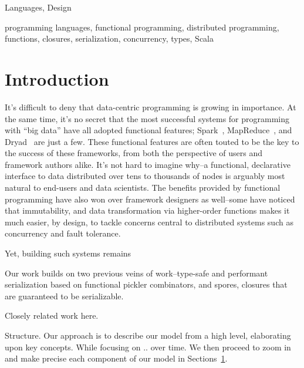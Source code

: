\documentclass[preprint]{sigplanconf}
\theoremstyle{definition}
\theoremstyle{definition}
\begin{document}
\terms
Languages, Design

\keywords
programming languages, functional programming, distributed programming,
functions, closures, serialization, concurrency, types, Scala

\section{Introduction}

It's difficult to deny that data-centric programming is growing in importance.
At the same time, it's no secret that the most successful systems for
programming with ``big data'' have all adopted functional features;
Spark~\cite{Spark}, MapReduce~\cite{MapReduce}, and Dryad~\cite{Dryad} are
just a few. These functional features are often touted to be the key to the
success of these frameworks, from both the perspective of users and framework
authors alike. It's not hard to imagine why--a functional, declarative
interface to data distributed over tens to thousands of nodes is arguably most
natural to end-users and data scientists. The benefits provided by functional
programming have also won over framework designers as well--some have noticed
that immutability, and data transformation via higher-order functions makes it
much easier, by design, to tackle concerns central to distributed systems such
as concurrency and fault tolerance.



Yet, building such systems remains

Our work builds on two previous veins of work--type-safe and performant
serialization based on functional pickler combinators, and spores, closures
that are guaranteed to be serializable.

Closely related work here.

Structure. Our approach is to describe our model from a high level,
elaborating upon key concepts. While focusing on .. over time. We then proceed
to zoom in and make precise each component of our model in Sections~\ref{}.


\end{document}
